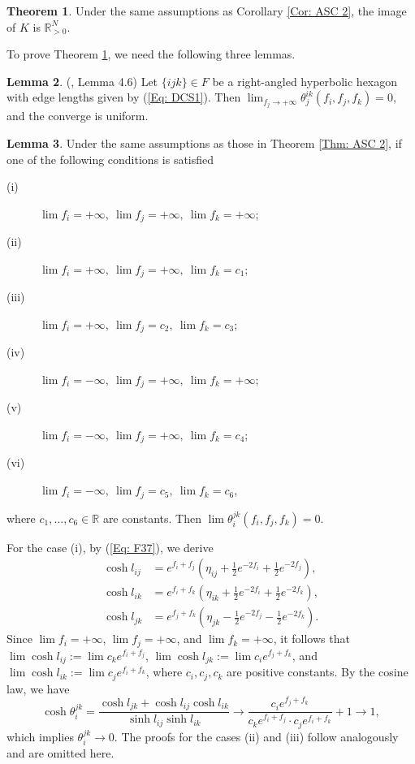 \documentclass[12pt]{amsart}
\theoremstyle{definition}
\newtheorem{theorem}{Theorem}[section]
\newtheorem{lemma}[theorem]{Lemma}
\begin{document}
\begin{theorem}\label{Thm: image 3}
Under the same assumptions as Corollary \ref{Cor: ASC 2}, the image of $K$ is $\mathbb{R}^N_{>0}$.
\end{theorem}

To prove Theorem \ref{Thm: image 3}, we need the following three lemmas.

\begin{lemma}(\cite{GL2}, Lemma 4.6)
\label{Lem: GL-limit}
Let $\{ijk\}\in F$ be a right-angled hyperbolic  hexagon with edge lengths given by (\ref{Eq: DCS1}).
Then $\lim_{f_j\rightarrow+\infty}\theta^{ik}_j(f_i,f_j,f_k)=0$, and the converge is uniform.
\end{lemma}

\begin{lemma}\label{Lem: limit c1}
Under the same assumptions as those in Theorem \ref{Thm: ASC 2},
if one of the following conditions is satisfied
\begin{description}
\item[(i)] $\lim f_i=+\infty,\ \lim f_j=+\infty,\ \lim f_k=+\infty$;
\item[(ii)] $\lim f_i=+\infty,\ \lim f_j=+\infty,\ \lim f_k=c_1$;
\item[(iii)] $\lim f_i=+\infty,\ \lim f_j=c_2,\ \lim f_k=c_3$;
\item[(iv)] $\lim f_i=-\infty,\ \lim f_j=+\infty,\ \lim f_k=+\infty$;
\item[(v)] $\lim f_i=-\infty,\ \lim f_j=+\infty,\ \lim f_k=c_4$;
\item[(vi)] $\lim f_i=-\infty,\ \lim f_j=c_5,\ \lim f_k=c_6$,
\end{description}
where $c_1,...,c_6\in \mathbb{R}$ are constants.
Then $\lim\theta^{jk}_i(f_i,f_j,f_k)=0$.
\end{lemma}
\proof
For the case (i), by (\ref{Eq: F37}), we derive
\begin{equation}\label{Eq: F18}
\begin{aligned}
\cosh l_{ij}
&=e^{f_i+f_j}(\eta_{ij}+\frac{1}{2}e^{-2f_i}
+\frac{1}{2}e^{-2f_j}),\\
\cosh l_{ik}
&=e^{f_i+f_k}(\eta_{ik}+\frac{1}{2}e^{-2f_i}
+\frac{1}{2}e^{-2f_k}),\\
\cosh l_{jk}
&=e^{f_j+f_k}(\eta_{jk}-\frac{1}{2}e^{-2f_j}
-\frac{1}{2}e^{-2f_k}).
\end{aligned}
\end{equation}
Since $\lim f_i=+\infty$, $\lim f_j=+\infty$, and $\lim f_k=+\infty$,
it follows that $\lim\cosh l_{ij}:=\lim c_ke^{f_i+f_j}$, $\lim\cosh l_{jk}:=\lim c_ie^{f_j+f_k}$, and $\lim\cosh l_{ik}:=\lim c_je^{f_i+f_k}$, where $c_i, c_j, c_k$ are positive constants. By the cosine law, we have
\begin{equation*}
\cosh \theta^{jk}_i=\frac{\cosh l_{jk}+\cosh l_{ij}\cosh l_{ik}}{\sinh l_{ij}\sinh l_{ik}}\rightarrow
\frac{c_ie^{f_j+f_k}}{c_ke^{f_i+f_j}\cdot c_je^{f_i+f_k}}+1
\rightarrow 1,
\end{equation*}
which implies $\theta^{jk}_i\rightarrow 0$.
The proofs for the cases (ii) and (iii) follow analogously and are omitted here.
\end{document}
